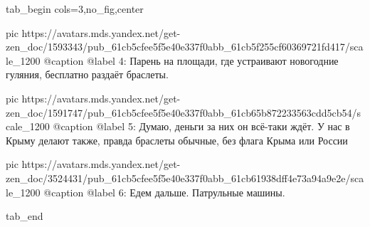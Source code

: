  
 
 
 
 


\ifcmt
  tab_begin cols=3,no_fig,center

     pic https://avatars.mds.yandex.net/get-zen_doc/1593343/pub_61cb5cfee5f5e40e337f0abb_61cb5f255cf60369721fd417/scale_1200
		 @caption @label 4: Парень на площади, где устраивают новогодние гуляния, бесплатно раздаёт браслеты.

		 pic https://avatars.mds.yandex.net/get-zen_doc/1591747/pub_61cb5cfee5f5e40e337f0abb_61cb65b872233563cdd5cb54/scale_1200
		 @caption @label 5: Думаю, деньги за них он всё-таки ждёт. У нас в Крыму делают также, правда браслеты обычные, без флага Крыма или России 

		 pic https://avatars.mds.yandex.net/get-zen_doc/3524431/pub_61cb5cfee5f5e40e337f0abb_61cb61938dff4e73a94a9e2e/scale_1200
		 @caption @label 6: Едем дальше. Патрульные машины.

  tab_end
\fi

